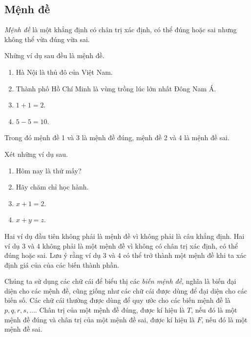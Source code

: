 \documentclass[11pt,fleqn]{book} %
\begin{document}
    \subsection{Mệnh đề}
    \begin{theorem} 
        \emph{Mệnh đề} là một khẳng định có chân trị xác định, có thể đúng hoặc sai nhưng không thể vừa đúng vừa sai.
    \end{theorem}
        \begin{example}
            Những ví dụ sau đều là mệnh đề.
            \begin{enumerate}
                \item Hà Nội là thủ đô của Việt Nam.
                \item Thành phố Hồ Chí Minh là vùng trồng lúc lớn nhất Đông Nam Á.
                \item $1 + 1 = 2$.
                \item $5 - 5 = 10$.
            \end{enumerate}
        \end{example}
        Trong đó mệnh đề 1 và 3 là mệnh đề đúng, mệnh đề 2 và 4 là mệnh đề sai.\\
        \begin{example}
            Xét những ví dụ sau.
            \begin{enumerate}
                \item Hôm nay là thứ mấy?
                \item Hãy chăm chỉ học hành.
                \item $x + 1 = 2$.
                \item $x + y = z$.
            \end{enumerate}
        \end{example}

        Hai ví dụ đầu tiên không phải là mệnh đề vì không phải là câu khẳng định. Hai ví dụ 3 và 4 không phải là một mệnh đề vì không có chân trị xác
        định, có thể đúng hoặc sai. Lưu ý rằng ví dụ 3 và 4 có thể trở thành một mệnh đề khi ta xác định giá của của các biến thành phần.

        Chúng ta sử dụng các chữ cái để biểu thị các \emph{biến mệnh đề}, nghĩa là biến đại diện cho các mệnh đề, cũng giống như các chữ cái được dùng
        để đại diện cho các biến số. Các chữ cái thường được dùng để quy ước cho các biến mệnh đề là $p, q, r, s, ...$. Chân trị của một mệnh đề đúng, được kí hiệu là
        $T$, nếu đó là một mệnh đề đúng và chân trị của một mệnh đề sai, được kí hiệu là $F$, nếu đó là một mệnh đề sai.
\end{document}
